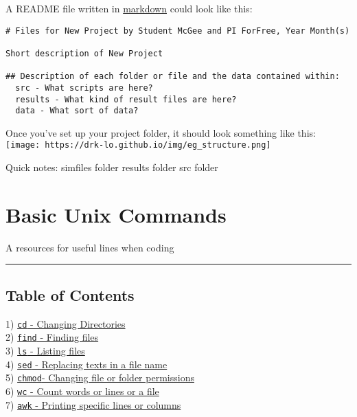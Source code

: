 \documentclass[
  letterpaper,
  DIV=11,
  numbers=noendperiod]{scrreprt}
\begin{document}
A README file written in
\href{https://www.markdownguide.org/cheat-sheet}{markdown} could look
like this:

\begin{verbatim}
# Files for New Project by Student McGee and PI ForFree, Year Month(s)

Short description of New Project

## Description of each folder or file and the data contained within:
  src - What scripts are here?
  results - What kind of result files are here?
  data - What sort of data?
\end{verbatim}

Once you've set up your project folder, it should look something like
this: \texttt{[image: https://drk-lo.github.io/img/eg\_structure.png]}

Quick notes: simfiles folder results folder src folder

\hypertarget{basic-unix-commands}{%
\chapter{Basic Unix Commands}\label{basic-unix-commands}}

A resources for useful lines when coding

\begin{center}\rule{0.5\linewidth}{0.5pt}\end{center}

\hypertarget{table-of-contents-1}{%
\section*{\texorpdfstring{\textbf{Table of
Contents}}{Table of Contents}}\label{table-of-contents-1}}


1)
\href{https://drk-lo.github.io/lotterhoslabprotocols/code_unixcommands/\#cd}{\texttt{cd}
- Changing Directories}\\
2)
\href{https://drk-lo.github.io/lotterhoslabprotocols/code_unixcommands/\#find}{\texttt{find}
- Finding files}\\
3)
\href{https://drk-lo.github.io/lotterhoslabprotocols/code_unixcommands/\#ls}{\texttt{ls}
- Listing files}\\
4)
\href{https://drk-lo.github.io/lotterhoslabprotocols/code_unixcommands/\#sed}{\texttt{sed}
- Replacing texts in a file name}\\
5)
\href{https://drk-lo.github.io/lotterhoslabprotocols/code_unixcommands/\#chmod}{\texttt{chmod}-
Changing file or folder permissions}\\
6)
\href{https://drk-lo.github.io/lotterhoslabprotocols/code_unixcommands/\#wc}{\texttt{wc}
- Count words or lines or a file}\\
7)
\href{https://drk-lo.github.io/lotterhoslabprotocols/code_unixcommands/\#awk}{\texttt{awk}
- Printing specific lines or columns}
\end{document}
